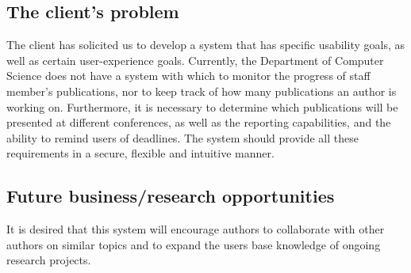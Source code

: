 \documentclass[a4paper]{article}
\begin{document}
    \subsection{The client's problem}
    	The client has solicited us to develop a system that has specific usability goals, as well as certain user-experience goals. Currently, the Department of Computer Science does not have a system with which to monitor the progress of staff member's publications, nor to keep track of how many publications an author is working on. Furthermore, it is necessary to determine which publications will be presented at different conferences, as well as the reporting capabilities, and the ability to remind users of deadlines. The system should provide all these requirements in a secure, flexible and intuitive manner.
   
	
\subsection{Future business/research opportunities}
	It is desired that this system will encourage authors to collaborate with other authors on similar topics and to expand the users base knowledge of ongoing research projects.
	\\
	\\
	\\
\end{document}
